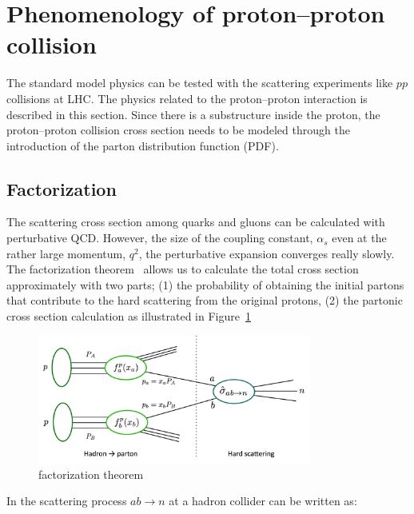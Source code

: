 \section{Phenomenology of proton--proton collision}
The standard model physics can be tested with the scattering experiments like $pp$ collisions at LHC.
The physics related to the proton--proton interaction is described in this section. 
Since there is a substructure inside the proton, the proton--proton collision cross section needs to be modeled through the introduction of the parton distribution function (PDF).

\subsection{Factorization}
\label{subsec:factorization}
The scattering cross section among quarks and gluons can be calculated with perturbative QCD. 
However, the size of the coupling constant, $\alpha_s$ even at the rather large momentum, $q^2$, the perturbative expansion converges really slowly.
The factorization theorem~\cite{https://doi.org/10.48550/arxiv.hep-ph/0409313} allows us to calculate the total cross section approximately with two parts; 
(1) the probability of obtaining the initial partons that contribute to the hard scattering from the original protons, 
(2) the partonic cross section calculation as illustrated in Figure~\ref{fig:factorization}
\begin{figure}[tbp]
\begin{center}
 \includegraphics[width=0.8\textwidth,keepaspectratio]{figures/factorization}
\caption{
 factorization theorem 
}
\label{fig:factorization}
\end{center}
\end{figure}
In the scattering process $ab \rightarrow n$ at a hadron collider can be written as:
